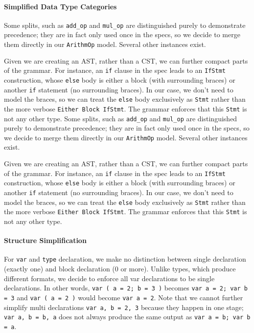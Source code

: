 \documentclass[11pt]{article}
\begin{document}
\paragraph{Simplified Data Type Categories}
Some splits, such as \texttt{add\_op} and \texttt{mul\_op} are
distinguished purely to demonstrate precedence; they are in fact only
used once in the specs, so we decide to merge them directly in our
\texttt{ArithmOp} model. Several other instances exist.

Given we are creating an AST, rather than a CST, we can further
compact parts of the grammar. For instance, an \texttt{if} clause in
the spec leads to an \texttt{IfStmt} construction, whose \texttt{else}
body is either a block (with surrounding braces) or another
\texttt{if} statement (no surrounding braces). In our case, we don't
need to model the braces, so we can treat the \texttt{else} body
exclusively as \texttt{Stmt} rather than the more verbose
\texttt{Either Block IfStmt}. The grammar enforces that this
\texttt{Stmt} is not any other type.  Some splits, such as
\texttt{add\_op} and \texttt{mul\_op} are distinguished purely to
demonstrate precedence; they are in fact only used once in the specs,
so we decide to merge them directly in our \texttt{ArithmOp}
model. Several other instances exist.

Given we are creating an AST, rather than a CST, we can further
compact parts of the grammar. For instance, an \texttt{if} clause in
the spec leads to an \texttt{IfStmt} construction, whose \texttt{else}
body is either a block (with surrounding braces) or another
\texttt{if} statement (no surrounding braces). In our case, we don't
need to model the braces, so we can treat the \texttt{else} body
exclusively as \texttt{Stmt} rather than the more verbose
\texttt{Either Block IfStmt}. The grammar enforces that this
\texttt{Stmt} is not any other type.
\paragraph{Structure Simplification}
For \texttt{var} and \texttt{type} declaration, we make no distinction
between single declaration (exactly one) and block declaration (0 or
more). Unlike types, which produce different formats, we decide to
enforce all var declarations to be single declarations. In other
words, \texttt{var ( a = 2; b = 3 )} becomes \texttt{var a = 2; var b
  = 3} and \texttt{var ( a = 2 )} would become \texttt{var a =
  2}. Note that we cannot further simplify multi declarations
\texttt{var a, b = 2, 3} because they happen in one stage; \texttt{var
  a, b = b, a} does not always produce the same output as \texttt{var
  a = b; var b = a}.
\end{document}

